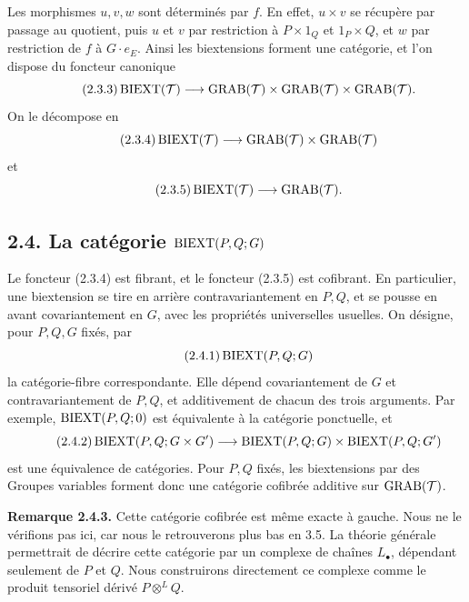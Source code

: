 \documentclass[11pt]{article}
\begin{document}
Les morphismes \(u,v,w\) sont déterminés par \(f\).  En effet, \(u\times v\) se récupère par passage au quotient, puis \(u\) et \(v\) par restriction à \(P\times1_Q\) et \(1_P\times Q\), et \(w\) par restriction de \(f\) à \(G\cdot e_E\).  Ainsi les biextensions forment une catégorie, et l'on dispose du foncteur canonique
\begin{equation}\tag{2.3.3}
  \operatorname{BIEXT}(\mathcal T)\longrightarrow\operatorname{GRAB}(\mathcal T)\times\operatorname{GRAB}(\mathcal T)\times\operatorname{GRAB}(\mathcal T).
\end{equation}
On le décompose en
\begin{equation}\tag{2.3.4}
  \operatorname{BIEXT}(\mathcal T)\longrightarrow\operatorname{GRAB}(\mathcal T)\times\operatorname{GRAB}(\mathcal T)
\end{equation}
et
\begin{equation}\tag{2.3.5}
  \operatorname{BIEXT}(\mathcal T)\longrightarrow\operatorname{GRAB}(\mathcal T).
\end{equation}

\subsection*{2.4. La catégorie \(\operatorname{BIEXT}(P,Q;G)\)}
Le foncteur (2.3.4) est fibrant, et le foncteur (2.3.5) est cofibrant.  En particulier, une biextension se tire en arrière contravariantement en \(P,Q\), et se pousse en avant covariantement en \(G\), avec les propriétés universelles usuelles.  On désigne, pour \(P,Q,G\) fixés, par
\begin{equation}\tag{2.4.1}
  \operatorname{BIEXT}(P,Q;G)
\end{equation}
la catégorie-fibre correspondante.  Elle dépend covariantement de \(G\) et contravariantement de \(P,Q\), et additivement de chacun des trois arguments.  Par exemple, \(\operatorname{BIEXT}(P,Q;0)\) est équivalente à la catégorie ponctuelle, et
\begin{equation}\tag{2.4.2}
  \operatorname{BIEXT}(P,Q;G\times G')\longrightarrow
  \operatorname{BIEXT}(P,Q;G)\times\operatorname{BIEXT}(P,Q;G')
\end{equation}
est une équivalence de catégories.  Pour \(P,Q\) fixés, les biextensions par des Groupes variables forment donc une catégorie cofibrée additive sur \(\operatorname{GRAB}(\mathcal T)\).

\textbf{Remarque 2.4.3.}  Cette catégorie cofibrée est même exacte à gauche.  Nous ne le vérifions pas ici, car nous le retrouverons plus bas en 3.5.  La théorie générale permettrait de décrire cette catégorie par un complexe de chaînes \(L_\bullet\), dépendant seulement de \(P\) et \(Q\).  Nous construirons directement ce complexe comme le produit tensoriel dérivé \(P\otimes^L Q\).
\end{document}
